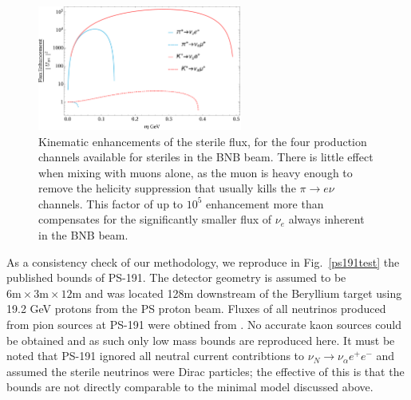 \documentclass[11pt, a4paper]{article}
\newcommand{\reffig}[1]{Fig.~\ref{#1}}
\begin{document}
\begin{figure}[t]
\center
	\includegraphics[width=0.6\textwidth]{figures/BNB_flux_enhancement.pdf} 
\caption{\label{fig:flux_enhancement}Kinematic enhancements of the sterile flux, for the four production channels available for steriles in the BNB beam. There is little effect when mixing with muons alone, as the muon is heavy enough to remove the helicity suppression that usually kills the $\pi\rightarrow e \nu$ channels. This factor of up to $10^5$ enhancement more than compensates for the significantly smaller flux of $\nu_e$ always inherent in the BNB beam.}

\end{figure}


As a consistency check of our methodology, we reproduce in \reffig{ps191test}
the published bounds of PS-191. The detector geometry is assumed to be
$6\text{m} \times 3\text{m} \times 12 \text{m}$ and was located 128m downstream
of the Beryllium target using 19.2 GeV protons from the PS proton beam.  Fluxes
of all neutrinos produced from pion sources at PS-191 were obtined from
\cite{ps191THesis}. No accurate kaon sources could be obtained and as such only
low mass bounds are reproduced here. It must be noted that PS-191 ignored all
neutral current contribtions to $\nu_N \rightarrow \nu_\alpha e^+ e^-$ and
assumed the sterile neutrinos were Dirac particles; the effective of this is
that the bounds are not directly comparable to the minimal model discussed
above.
\end{document}
